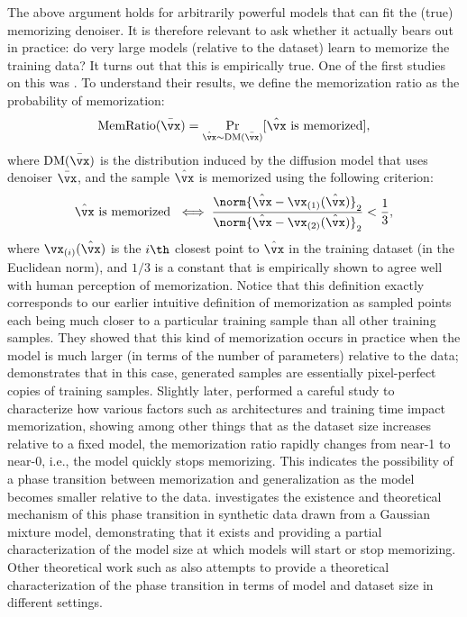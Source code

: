 \documentclass[../../book-main.tex]{subfiles}
\begin{document}
The above argument holds for arbitrarily powerful models that can
fit the (true) memorizing denoiser. It is therefore relevant to ask
whether it actually bears out in practice: do very large models
(relative to the dataset) learn to memorize the training data? It
turns out that this is empirically true. One of the first studies on
this was \cite{yoon2023diffusion}. To understand their results, we define the
memorization ratio as the probability of memorization:
\begin{equation}
    \mathrm{MemRatio}(\bar{\vx}) = \Pr_{\hat{\vx} \sim
    \mathrm{DM}(\bar{\vx})}[\hat{\vx}\ \text{is memorized}],
\end{equation}
where \(\mathrm{DM}(\bar{\vx})\) is the distribution induced by the
diffusion model that uses denoiser \(\bar{\vx}\), and the sample
\(\hat{\vx}\) is memorized using the following criterion:
\begin{equation}\label{eq:diffusion_euclidean_memorization_criterion}
    \hat{\vx}\ \text{is memorized}\ \iff \frac{\norm{\hat{\vx} -
    \vx_{(1)}(\hat{\vx})}_{2}}{\norm{\hat{\vx} -
    \vx_{(2)}(\hat{\vx})}_{2}} < \frac{1}{3},
\end{equation}
where \(\vx_{(i)}(\hat{\vx})\) is the \(i\th\) closest point to
\(\hat{\vx}\) in the training dataset (in the Euclidean norm), and
\(1/3\) is a constant that is empirically shown to agree well with
human perception of memorization. Notice that this definition exactly
corresponds to our earlier intuitive definition of memorization as
sampled points each being much closer to a particular training sample than all
other training samples. They showed that this kind of memorization
occurs in practice when the model is much larger (in terms of the
number of parameters) relative to the data;
 demonstrates that
in this case, generated samples are essentially pixel-perfect copies
of training samples. Slightly later, \cite{gu2023memorization}
performed a careful study to characterize how various factors such as
architectures and training time impact memorization, showing among
other things that as the dataset size increases relative to a fixed
model, the memorization ratio rapidly changes from near-1 to near-0,
i.e., the model quickly stops memorizing. This
indicates the possibility of a phase transition between memorization
and generalization as the model becomes smaller relative to the data.
\cite{buchanan2025edge} investigates the existence and theoretical
mechanism of this phase transition in synthetic data drawn from a
Gaussian mixture model, demonstrating that it exists and providing a partial
characterization of the model size at which models will start
or stop memorizing. Other theoretical work such as
\cite{niedoba2024towards,kamb2024analytic,george2025denoising,zhang2025generalization}
also attempts to provide a theoretical characterization of the phase
transition in terms of model and dataset size in different settings.
\end{document}
